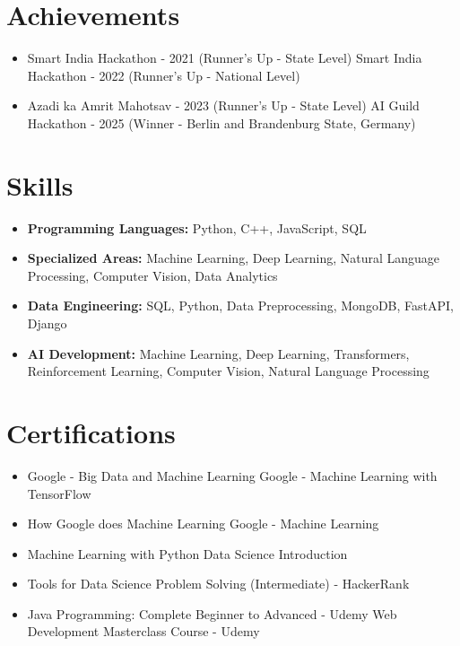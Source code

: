 \documentclass[a4paper,10pt]{article}
\begin{document}
\section*{Achievements}
\begin{itemize}
\item Smart India Hackathon - 2021 (Runner's Up - State Level) \hfill Smart India Hackathon - 2022 (Runner's Up - National Level)
\item Azadi ka Amrit Mahotsav - 2023 (Runner's Up - State Level) \hfill AI Guild Hackathon - 2025 (Winner - Berlin and Brandenburg State, Germany)
\end{itemize}

\section*{Skills}
\begin{itemize}
  \item \textbf{Programming Languages:} Python, C++, JavaScript, SQL
  \item \textbf{Specialized Areas:} Machine Learning, Deep Learning, Natural Language Processing, Computer Vision, Data Analytics
  \item \textbf{Data Engineering:} SQL, Python, Data Preprocessing, MongoDB, FastAPI, Django
  \item \textbf{AI Development:} Machine Learning, Deep Learning, Transformers, Reinforcement Learning, Computer Vision, Natural Language Processing
\end{itemize}

\section*{Certifications}
\begin{itemize}
\item Google - Big Data and Machine Learning \hfill Google - Machine Learning with TensorFlow
\item How Google does Machine Learning \hfill Google - Machine Learning
\item Machine Learning with Python \hfill Data Science Introduction
\item Tools for Data Science \hfill Problem Solving (Intermediate) - HackerRank
\item Java Programming: Complete Beginner to Advanced - Udemy \hfill Web Development Masterclass Course - Udemy
\end{itemize}
\end{document}
